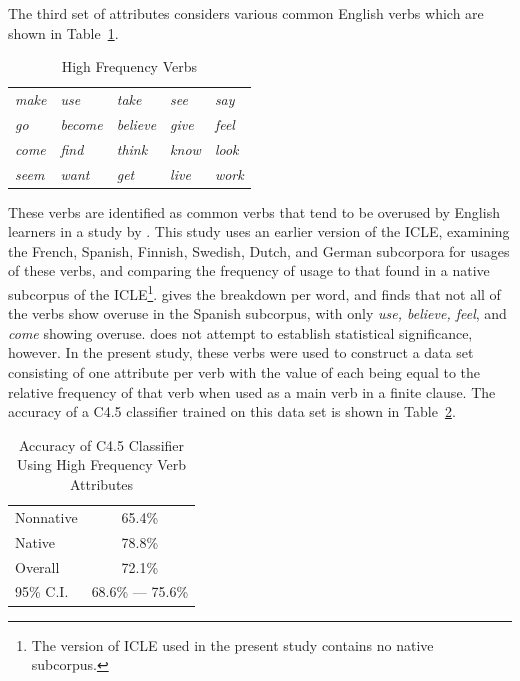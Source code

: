 \documentclass[main.tex]{subfiles}
\begin{document}
The third set of attributes considers various common English verbs which are shown in Table~\ref{table:high-freq-verbs}.
\begin{table}[htbp]
\centering
\caption{High Frequency Verbs}
\begin{tabular}{>{\itshape}l >{\itshape}l >{\itshape}l >{\itshape}l >{\itshape}l}
\toprule
make & use & take & see & say\\
go & become & believe & give & feel\\
come & find & think & know & look\\
seem & want & get & live & work\\
\bottomrule
\end{tabular}
\label{table:high-freq-verbs}
\end{table}
These verbs are identified as common verbs that tend to be overused by English learners in a study by \citet{ringbom:1998}. This study uses an earlier version of the ICLE, examining the French, Spanish, Finnish, Swedish, Dutch, and German subcorpora for usages of these verbs, and comparing the frequency of usage to that found in a native subcorpus of the ICLE\footnote{The version of ICLE used in the present study contains no native subcorpus.}. \citeauthor{ringbom:1998} gives the breakdown per word, and finds that not all of the verbs show overuse in the Spanish subcorpus, with only \textit{use, believe, feel}, and \textit{come} showing overuse. \citeauthor{ringbom:1998} does not attempt to establish statistical significance, however. In the present study, these verbs were used to construct a data set consisting of one attribute per verb with the value of each being equal to the relative frequency of that verb when used as a main verb in a finite clause. The accuracy of a C4.5 classifier trained on this data set is shown in Table~\ref{table:high-freq-results}.
\begin{table}[htbp]
\centering
\caption{Accuracy of C4.5 Classifier Using High Frequency Verb Attributes}
\begin{tabular}{l c}
\toprule
Nonnative & 65.4\% \\
Native & 78.8\% \\
Overall & 72.1\% \\
95\% C.I. & 68.6\% --- 75.6\%\\
\bottomrule
\end{tabular}
\label{table:high-freq-results}
\end{table}
\end{document}
